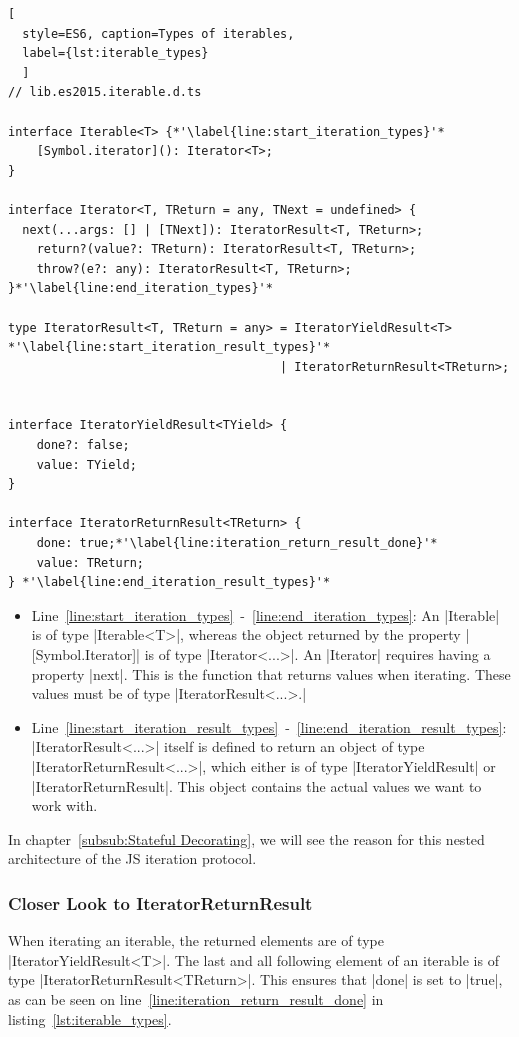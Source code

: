\begin{lstlisting}[
  style=ES6, caption=Types of iterables,
  label={lst:iterable_types}
  ]
// lib.es2015.iterable.d.ts

interface Iterable<T> {*'\label{line:start_iteration_types}'*
    [Symbol.iterator](): Iterator<T>;
}

interface Iterator<T, TReturn = any, TNext = undefined> {
  next(...args: [] | [TNext]): IteratorResult<T, TReturn>;
    return?(value?: TReturn): IteratorResult<T, TReturn>;
    throw?(e?: any): IteratorResult<T, TReturn>;
}*'\label{line:end_iteration_types}'*

type IteratorResult<T, TReturn = any> = IteratorYieldResult<T> *'\label{line:start_iteration_result_types}'*
                                      | IteratorReturnResult<TReturn>;


interface IteratorYieldResult<TYield> {
    done?: false;
    value: TYield;
}

interface IteratorReturnResult<TReturn> {
    done: true;*'\label{line:iteration_return_result_done}'*
    value: TReturn;
} *'\label{line:end_iteration_result_types}'*
\end{lstlisting}

\begin{itemize}
  \item{Line~\ref{line:start_iteration_types}~-~\ref{line:end_iteration_types}: 
      An |Iterable| is of type |Iterable<T>|, whereas the object returned by the property
      |[Symbol.Iterator]| is of type |Iterator<...>|. An |Iterator| requires having a property |next|. 
      This is the function that returns values when iterating. These values must be 
      of type |IteratorResult<...>.|
    }
  \item{Line~\ref{line:start_iteration_result_types}~-~\ref{line:end_iteration_result_types}:
      |IteratorResult<...>| itself is defined to return an 
      object of type |IteratorReturnResult<...>|, which either is of type
      |IteratorYieldResult| or |IteratorReturnResult|. This object contains the actual 
      values we want to work with.}
\end{itemize}

In chapter~\ref{subsub:Stateful Decorating}, we will see the reason for this
nested architecture of the JS iteration protocol.

\subsubsection{Closer Look to IteratorReturnResult}
\label{subsub:Closer look to IteratorReturnResult}
When iterating an iterable, the returned elements are of type
|IteratorYieldResult<T>|. The last and all following element of an iterable is of type
|IteratorReturnResult<TReturn>|. This ensures that |done| is set to |true|, as 
can be seen on line~\ref{line:iteration_return_result_done} in listing~\ref{lst:iterable_types}.


